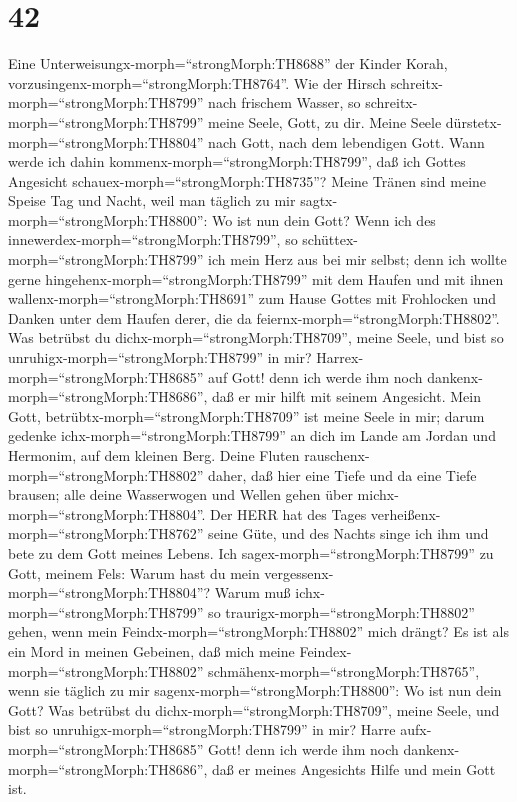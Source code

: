 \hypertarget{section-41}{%
\section{42}\label{section-41}}

 Eine Unterweisungx-morph=``strongMorph:TH8688'' der Kinder
Korah, vorzusingenx-morph=``strongMorph:TH8764''. Wie der Hirsch
schreitx-morph=``strongMorph:TH8799'' nach frischem Wasser, so
schreitx-morph=``strongMorph:TH8799'' meine Seele, Gott, zu dir.
 Meine Seele dürstetx-morph=``strongMorph:TH8804'' nach
Gott, nach dem lebendigen Gott. Wann werde ich dahin
kommenx-morph=``strongMorph:TH8799'', daß ich Gottes Angesicht
schauex-morph=``strongMorph:TH8735''?  Meine Tränen sind
meine Speise Tag und Nacht, weil man täglich zu mir
sagtx-morph=``strongMorph:TH8800'': Wo ist nun dein Gott? 
Wenn ich des innewerdex-morph=``strongMorph:TH8799'', so
schüttex-morph=``strongMorph:TH8799'' ich mein Herz aus bei mir selbst;
denn ich wollte gerne hingehenx-morph=``strongMorph:TH8799'' mit dem
Haufen und mit ihnen wallenx-morph=``strongMorph:TH8691'' zum Hause
Gottes mit Frohlocken und Danken unter dem Haufen derer, die da
feiernx-morph=``strongMorph:TH8802''.  Was betrübst du
dichx-morph=``strongMorph:TH8709'', meine Seele, und bist so
unruhigx-morph=``strongMorph:TH8799'' in mir?
Harrex-morph=``strongMorph:TH8685'' auf Gott! denn ich werde ihm noch
dankenx-morph=``strongMorph:TH8686'', daß er mir hilft mit seinem
Angesicht.  Mein Gott, betrübtx-morph=``strongMorph:TH8709''
ist meine Seele in mir; darum gedenke ichx-morph=``strongMorph:TH8799''
an dich im Lande am Jordan und Hermonim, auf dem kleinen Berg.
 Deine Fluten rauschenx-morph=``strongMorph:TH8802'' daher,
daß hier eine Tiefe und da eine Tiefe brausen; alle deine Wasserwogen
und Wellen gehen über michx-morph=``strongMorph:TH8804''. 
Der HERR hat des Tages verheißenx-morph=``strongMorph:TH8762'' seine
Güte, und des Nachts singe ich ihm und bete zu dem Gott meines Lebens.
 Ich sagex-morph=``strongMorph:TH8799'' zu Gott, meinem
Fels: Warum hast du mein vergessenx-morph=``strongMorph:TH8804''? Warum
muß ichx-morph=``strongMorph:TH8799'' so
traurigx-morph=``strongMorph:TH8802'' gehen, wenn mein
Feindx-morph=``strongMorph:TH8802'' mich drängt?  Es ist
als ein Mord in meinen Gebeinen, daß mich meine
Feindex-morph=``strongMorph:TH8802''
schmähenx-morph=``strongMorph:TH8765'', wenn sie täglich zu mir
sagenx-morph=``strongMorph:TH8800'': Wo ist nun dein Gott? 
Was betrübst du dichx-morph=``strongMorph:TH8709'', meine Seele, und
bist so unruhigx-morph=``strongMorph:TH8799'' in mir? Harre
aufx-morph=``strongMorph:TH8685'' Gott! denn ich werde ihm noch
dankenx-morph=``strongMorph:TH8686'', daß er meines Angesichts Hilfe und
mein Gott ist.

